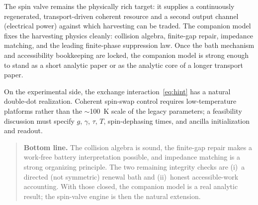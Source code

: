 \documentclass[11pt,a4paper]{article}
\newenvironment{notebox}{\begin{quote}\small}{\end{quote}}
\begin{document}
The spin valve remains the physically rich target: it supplies a continuously regenerated, transport-driven coherent resource and a second output channel (electrical power) against which harvesting can be traded. The companion model fixes the harvesting physics cleanly: collision algebra, finite-gap repair, impedance matching, and the leading finite-phase suppression law. Once the bath mechanism and accessibility bookkeeping are locked, the companion model is strong enough to stand as a short analytic paper or as the analytic core of a longer transport paper.

On the experimental side, the exchange interaction~\eqref{eq:hint} has a natural double-dot realization. Coherent spin-swap control requires low-temperature platforms rather than the $\sim$100~K scale of the legacy parameters; a feasibility discussion must specify $g$, $\gamma$, $\tau$, $T$, spin-dephasing times, and ancilla initialization and readout.

\begin{notebox}
\textbf{Bottom line.} The collision algebra is sound, the finite-gap repair makes a work-free battery interpretation possible, and impedance matching is a strong organizing principle. The two remaining integrity checks are (i)~a directed (not symmetric) renewal bath and (ii)~honest accessible-work accounting. With those closed, the companion model is a real analytic result; the spin-valve engine is then the natural extension.
\end{notebox}
\end{document}
